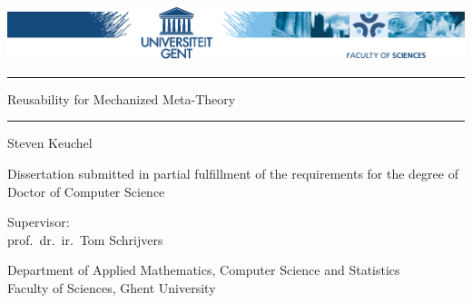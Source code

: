 \begin{titlepage}
\centering
\includegraphics[width=\textwidth]{figs/WE.eps}

\vspace{1cm}


\vspace{2.25cm}

\hrule
\vspace{0.5cm}
{\Huge \textsf{Reusability for Mechanized Meta-Theory}}
%
\vspace{0.5cm}
\hrule

\vspace{2.25cm}

{\LARGE \textsf{Steven Keuchel}}

\vspace{2.25cm}

{\textsf{Dissertation submitted in partial fulfillment of the requirements for the degree of Doctor of Computer Science}}

\vfill

{\textsf{Supervisor: \\
prof.~dr.~ir.~Tom Schrijvers}}



\vfill

{\textsf{Department of Applied Mathematics, Computer Science and Statistics\\
Faculty of Sciences, Ghent University}}
\end{titlepage}

